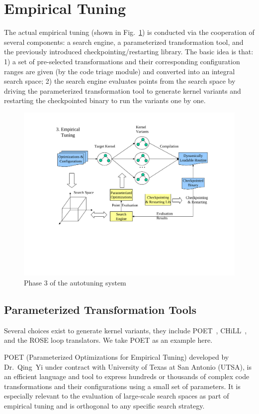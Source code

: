\section{Empirical Tuning}
The actual empirical tuning (shown in Fig.~\ref{fig:phase3}) is conducted via the cooperation of several
components: a search engine, a parameterized transformation tool, and 
the previously introduced checkpointing/restarting library.
The basic idea is that:
1) a set of pre-selected transformations and their corresponding configuration
   ranges are given (by the code triage module) and converted into an integral
   search space; 
2) the search engine evaluates points from the search space by driving the parameterized
   transformation tool to generate kernel variants and restarting the checkpointed binary
   to run the variants one by one.
\begin{figure}[htbp]
       \centering
               \includegraphics[width=1.2\textwidth]{phase3.pdf}
       \caption{Phase 3 of the autotuning system}
       \label{fig:phase3}
\end{figure}

\subsection{Parameterized Transformation Tools}
Several choices exist to generate kernel variants, they include
POET~\cite{YiPOET2007},
CHiLL~\cite{ChenCHiLL2008}, and the ROSE loop translators. We take POET as an example here. 

POET (Parameterized Optimizations for Empirical
Tuning) developed by Dr.~Qing~Yi under contract with University of
Texas at San Antonio (UTSA), is an efficient language and tool to express hundreds or
thousands of complex code transformations and their configurations using a small set
of parameters.  It is especially relevant to the evaluation of large-scale search spaces
as part of empirical tuning and is orthogonal to any specific search strategy.

